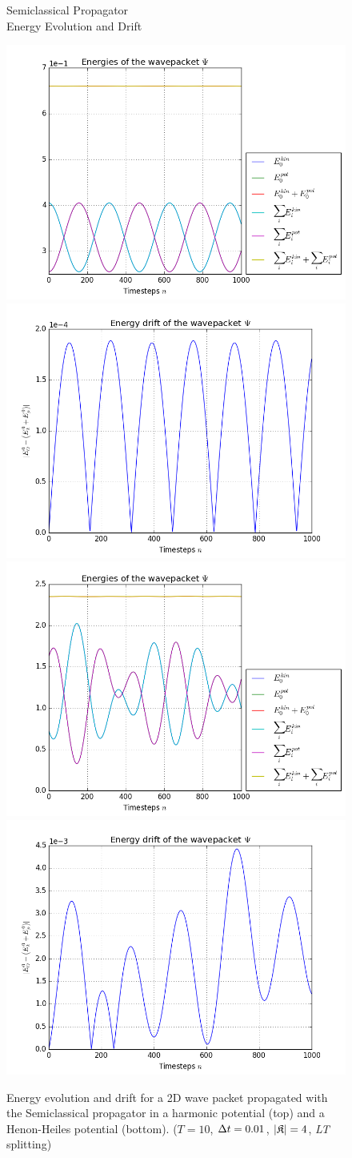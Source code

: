 \begin{figure}[ht]
	\centering
	\begin{minipage}[c]{\textwidth}
		\begin{center}
			\large Semiclassical Propagator \\[1mm]
			\normalsize Energy Evolution and Drift
			\vspace{4mm}
		\end{center}
	\end{minipage}
	\includegraphics[width=.45\textwidth]{figures/harmonic_energies_Semiclassical.png}
	\includegraphics[width=.45\textwidth]{figures/harmonic_drift_Semiclassical.png} \\
	\includegraphics[width=.45\textwidth]{figures/henon_energies_Semiclassical.png}
	\includegraphics[width=.45\textwidth]{figures/henon_drift_Semiclassical.png}
	\caption{Energy evolution and drift for a 2D wave packet propagated with the Semiclassical propagator in a harmonic potential (top) and a Henon-Heiles potential (bottom).
	($T = 10$, $\Delta t = 0.01$, $| \mathfrak{K} | = 4$, \emph{LT} splitting)}
	\label{fig:energy_Semiclassical}
\end{figure}


